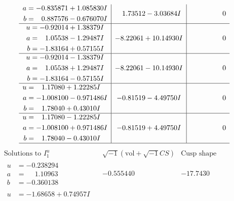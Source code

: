 \documentclass[1p]{elsarticle_modified}
\theoremstyle{definition}
\newcommand{\I}{\sqrt{-1}}
\begin{document}
$$\begin{array}{c|c|c}
\begin{aligned}
a &= -0.835871 + 1.085830 I \\
b &= \phantom{-}0.887576 - 0.676070 I\end{aligned}
 & \phantom{-}1.73512 - 3.03684 I & \phantom{-0.000000 } 0 \\ \hline\begin{aligned}
u &= -0.92014 + 1.38379 I \\
a &= \phantom{-}1.05538 - 1.29487 I \\
b &= -1.83164 + 0.57155 I\end{aligned}
 & -8.22061 + 10.14930 I & \phantom{-0.000000 } 0 \\ \hline\begin{aligned}
u &= -0.92014 - 1.38379 I \\
a &= \phantom{-}1.05538 + 1.29487 I \\
b &= -1.83164 - 0.57155 I\end{aligned}
 & -8.22061 - 10.14930 I & \phantom{-0.000000 } 0 \\ \hline\begin{aligned}
u &= \phantom{-}1.17080 + 1.22285 I \\
a &= -1.008100 - 0.971486 I \\
b &= \phantom{-}1.78040 + 0.43010 I\end{aligned}
 & -0.81519 - 4.49750 I & \phantom{-0.000000 } 0 \\ \hline\begin{aligned}
u &= \phantom{-}1.17080 - 1.22285 I \\
a &= -1.008100 + 0.971486 I \\
b &= \phantom{-}1.78040 - 0.43010 I\end{aligned}
 & -0.81519 + 4.49750 I & \phantom{-0.000000 } 0\\
 \hline 
 \end{array}$$\newpage$$\begin{array}{c|c|c}  
\text{Solutions to }I^u_{1}& \I (\text{vol} + \sqrt{-1}CS) & \text{Cusp shape}\\
 \hline 
\begin{aligned}
u &= -0.238294\phantom{ +0.000000I} \\
a &= \phantom{-}1.10963\phantom{ +0.000000I} \\
b &= -0.360138\phantom{ +0.000000I}\end{aligned}
 & -0.555440\phantom{ +0.000000I} & -17.7430\phantom{ +0.000000I} \\ \hline\begin{aligned}
u &= -1.68658 + 0.74957 I \\

\end{aligned}
\end{array}$$
\end{document}
